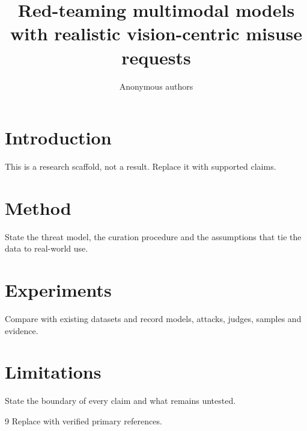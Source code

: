 \documentclass{article}
\title{Red-teaming multimodal models with realistic vision-centric misuse requests}
\author{Anonymous authors}
\begin{document}
\maketitle
\begin{abstract}

\end{abstract}
\section{Introduction}
This is a research scaffold, not a result. Replace it with supported claims.
\section{Method}
State the threat model, the curation procedure and the assumptions that tie the data to real-world use.
\section{Experiments}
Compare with existing datasets and record models, attacks, judges, samples and evidence.
\section{Limitations}
State the boundary of every claim and what remains untested.
\label{crux:main-end}
\begin{thebibliography}{9}
 Replace with verified primary references.
\end{thebibliography}
\end{document}
